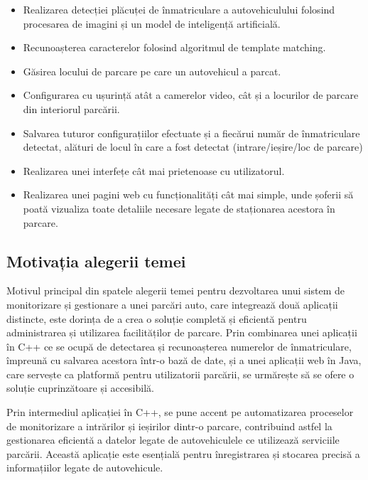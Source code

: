 \documentclass[12pt]{article}
\begin{document}
\begin{itemize}
    \item Realizarea detecției pl\u{a}cuței de \^{i}nmatriculare a autovehiculului folosind procesarea de imagini și un model de inteligenț\u{a} artificial\u{a}.
    \item Recunoașterea caracterelor folosind algoritmul de template matching.
    \item G\u{a}sirea locului de parcare pe care un autovehicul a parcat.
    \item Configurarea cu ușurinț\u{a} at\^{a}t a camerelor video, c\^{a}t și a locurilor de parcare din interiorul parc\u{a}rii.
    \item Salvarea tuturor configurațiilor efectuate și a fiec\u{a}rui num\u{a}r de \^{i}nmatriculare detectat, al\u{a}turi de locul \^{i}n care a fost detectat (intrare/ieșire/loc de parcare)
    \item Realizarea unei interfețe c\^{a}t mai prietenoase cu utilizatorul.
    \item Realizarea unei pagini web cu funcționalit\u{a}ți c\^{a}t mai simple, unde șoferii s\u{a} poat\u{a} vizualiza toate detaliile necesare legate de staționarea acestora \^{i}n parcare.
\end{itemize}

\subsection{Motivația alegerii temei}

Motivul principal din spatele alegerii temei pentru dezvoltarea unui sistem de monitorizare și gestionare a unei parc\u{a}ri auto, care integreaz\u{a} dou\u{a} aplicații distincte, este dorința de a crea o soluție complet\u{a} și eficient\u{a} pentru administrarea și utilizarea facilit\u{a}ților de parcare. Prin combinarea unei aplicații \^{i}n C++ ce se ocup\u{a} de detectarea și recunoașterea numerelor de \^{i}nmatriculare, \^{i}mpreun\u{a} cu salvarea acestora \^{i}ntr-o baz\u{a} de date, și a unei aplicații web \^{i}n Java, care servește ca platform\u{a} pentru utilizatorii parc\u{a}rii, se urm\u{a}rește s\u{a} se ofere o soluție cuprinz\u{a}toare și accesibil\u{a}.

Prin intermediul aplicației \^{i}n C++, se pune accent pe automatizarea proceselor de monitorizare a intr\u{a}rilor și ieșirilor dintr-o parcare, contribuind astfel la gestionarea eficient\u{a} a datelor legate de autovehiculele ce utilizeaz\u{a} serviciile parc\u{a}rii. Aceast\u{a} aplicație este esențial\u{a} pentru \^{i}nregistrarea și stocarea precis\u{a} a informațiilor legate de autovehicule.
\end{document}
